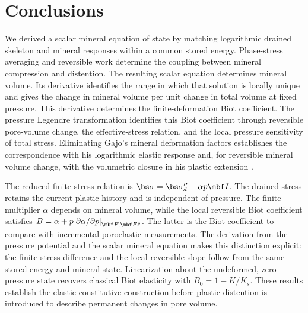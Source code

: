 \section{Conclusions}
\label{sec:conclusions}

We derived a scalar mineral equation of state by matching logarithmic
drained skeleton and mineral responses within a common stored energy.
Phase-stress averaging and reversible work determine the coupling between
mineral compression and distention.  The resulting scalar equation
determines mineral volume.  Its derivative
identifies the range in which that solution is locally unique and gives
the change in mineral volume per unit change in total volume at fixed
pressure.  This derivative determines the finite-deformation Biot
coefficient.  The pressure Legendre transformation identifies this
Biot coefficient through reversible pore-volume change, the effective-stress
relation, and the local pressure sensitivity of total stress.  Eliminating
Gajo's mineral deformation factors establishes the correspondence with his
logarithmic elastic response and, for reversible mineral volume change,
with the volumetric closure in his plastic extension \citep{gajo2010,gajo2011}.

The reduced finite stress relation is
\(\bs\sigma=\bs\sigma^{\prime\prime}_d-\alpha p\mbf I\).
The drained stress retains the current plastic history and is independent
of pressure.  The finite multiplier \(\alpha\) depends on mineral volume,
while the local reversible Biot coefficient satisfies
\(B=\alpha+p\left.\partial\alpha/\partial p\right|_{\mbf F,\mbf F^p}\).
The latter is the Biot coefficient to compare with incremental poroelastic
measurements.  The derivation from the pressure potential and the scalar
mineral equation
makes this distinction explicit: the finite stress difference and the local
reversible slope follow from the same stored energy and mineral state.
Linearization about the undeformed, zero-pressure state
recovers classical Biot elasticity with \(B_0=1-K/K_s\).  These results
establish the elastic constitutive construction before plastic distention
is introduced to describe permanent changes in pore volume.

